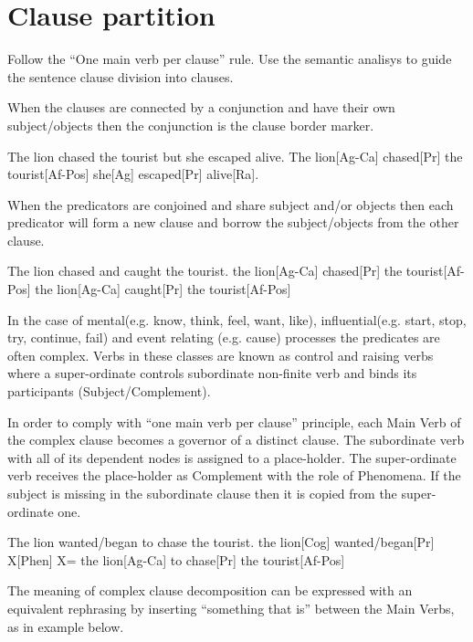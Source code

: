 \section{Clause partition}
Follow the ``One main verb per clause'' rule. Use the semantic analisys to guide the sentence clause division into clauses. 

When the clauses are connected by a conjunction and have their own subject/objects then the conjunction is the clause border marker.  
\begin{exe}
    \ex The lion chased the tourist but she escaped alive. 
    \ex The lion[Ag-Ca] chased[Pr] the tourist[Af-Pos]
    \ex she[Ag] escaped[Pr] alive[Ra].
\end{exe}

When the predicators are conjoined and share subject and/or objects then each predicator will form a new clause and borrow the subject/objects from the other clause. 

\begin{exe}
    \ex The lion chased and caught the tourist.
    \ex the lion[Ag-Ca] chased[Pr] the tourist[Af-Pos]
    \ex the lion[Ag-Ca] caught[Pr] the tourist[Af-Pos]
\end{exe}

In the case of mental(e.g. know, think, feel, want, like), influential(e.g. start, stop, try, continue, fail) and event relating (e.g. cause) processes the predicates are often complex. Verbs in these classes are known as control and raising verbs \citep{Haegeman91} where a super-ordinate controls subordinate non-finite verb and binds its participants (Subject/Complement). 

In order to comply with “one main verb per clause” principle, each Main Verb of the complex clause becomes a governor of a distinct clause. The subordinate verb with all of its dependent nodes is assigned to a place-holder. The super-ordinate verb receives the place-holder as Complement with the role of Phenomena. If the subject is missing in the subordinate clause then it is copied from the super-ordinate one. 

\begin{exe}
    \ex The lion wanted/began to chase the tourist.
    \ex the lion[Cog] wanted/began[Pr] X[Phen]
    \ex X= the lion[Ag-Ca] to chase[Pr] the tourist[Af-Pos]
\end{exe}

The meaning of complex clause decomposition can be expressed with an equivalent rephrasing by inserting “something that is” between the Main Verbs, as in example below. 

